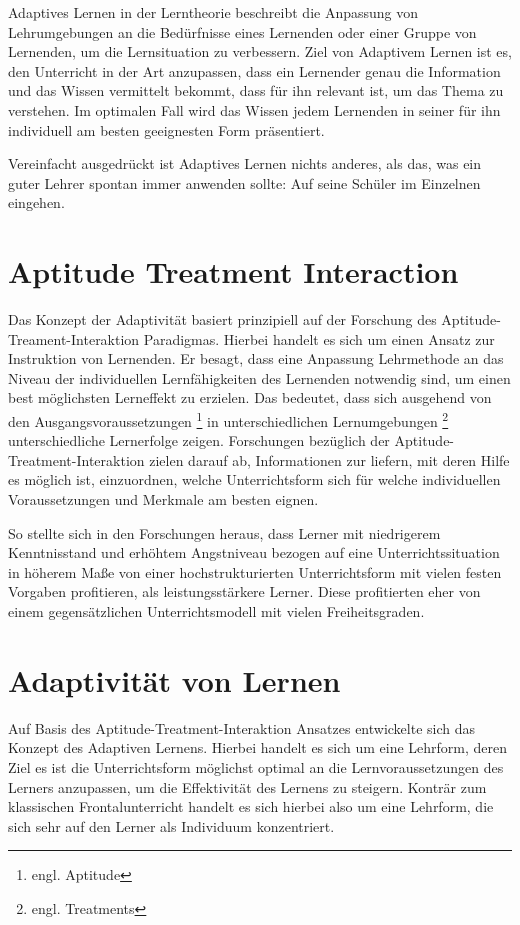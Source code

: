 Adaptives Lernen in der Lerntheorie beschreibt die Anpassung von Lehrumgebungen
an die Bedürfnisse eines Lernenden oder einer Gruppe von Lernenden, um die Lernsituation
zu verbessern. Ziel von Adaptivem Lernen ist es, den Unterricht in der Art anzupassen,
dass ein Lernender genau die Information und das Wissen vermittelt bekommt, dass für ihn relevant ist,
um das Thema zu verstehen. Im optimalen Fall wird das Wissen jedem Lernenden
in seiner für ihn individuell am besten geeignesten Form präsentiert.

Vereinfacht ausgedrückt ist Adaptives Lernen nichts anderes, als das, was ein guter Lehrer
spontan immer anwenden sollte: Auf seine Schüler im Einzelnen eingehen.

\section{Aptitude Treatment Interaction}
Das Konzept der Adaptivität basiert prinzipiell auf der Forschung des Aptitude-Treament-Interaktion Paradigmas.
Hierbei handelt es sich um einen Ansatz zur Instruktion von Lernenden.
Er besagt, dass eine Anpassung Lehrmethode an das Niveau der individuellen Lernfähigkeiten
des Lernenden notwendig sind, um einen best möglichsten Lerneffekt zu erzielen.
Das bedeutet, dass sich ausgehend von den Ausgangsvoraussetzungen \footnote{engl. Aptitude}
in unterschiedlichen Lernumgebungen \footnote{engl. Treatments} unterschiedliche Lernerfolge zeigen.
Forschungen bezüglich der Aptitude-Treatment-Interaktion zielen darauf ab, Informationen
zur liefern, mit deren Hilfe es möglich ist, einzuordnen, welche Unterrichtsform sich
für welche individuellen Voraussetzungen und Merkmale am besten eignen.\cite[S. 203]{krohne2007psychologische}

So stellte sich in den Forschungen heraus, dass Lerner mit niedrigerem Kenntnisstand und erhöhtem Angstniveau bezogen auf
eine Unterrichtssituation in höherem Maße von einer hochstrukturierten Unterrichtsform mit vielen festen Vorgaben profitieren,
als leistungsstärkere Lerner. Diese profitierten eher von einem gegensätzlichen Unterrichtsmodell mit vielen Freiheitsgraden.
\cite[S.65]{hasselhornlernverlaufsdiagnostik}

\section{Adaptivität von Lernen}
Auf Basis des Aptitude-Treatment-Interaktion Ansatzes entwickelte sich das Konzept des Adaptiven Lernens.
Hierbei handelt es sich um eine Lehrform, deren Ziel es ist die Unterrichtsform möglichst optimal an die Lernvoraussetzungen
des Lerners anzupassen, um die Effektivität des Lernens zu steigern. Konträr zum klassischen Frontalunterricht handelt
es sich hierbei also um eine Lehrform, die sich sehr auf den Lerner als Individuum konzentriert.

